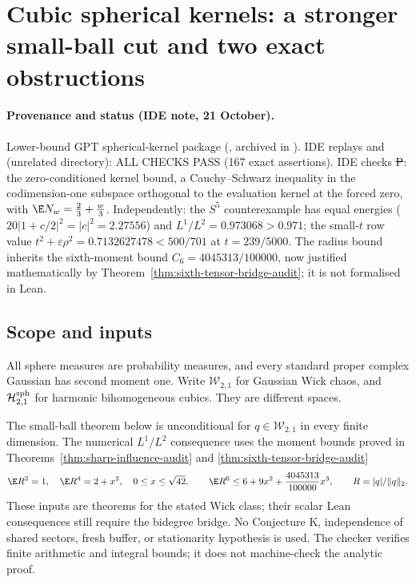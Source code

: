 \section[Cubic spherical kernels]{Cubic spherical kernels: a stronger small-ball cut and two exact obstructions}
\label{ch:spherical-kernel-cut}

\paragraph{Provenance and status (IDE note, 21 October).} Lower-bound GPT spherical-kernel package (, archived in
). IDE replays  and  (unrelated directory): ALL CHECKS PASS
(167 exact assertions). IDE checks \st{P}: the zero-conditioned kernel bound, a Cauchy--Schwarz inequality in the codimension-one subspace orthogonal to
the evaluation kernel at the forced zero, with $\E N_w=\frac23+\frac w3$. Independently: the $S^5$ counterexample has equal energies ($20|1+c/2|^2=|c|^2=2.27556$)
and $L^1/L^2=0.973068>0.971$; the small-$t$ row value $t^2+\varepsilon\rho^2=0.7132627478<500/701$ at $t=239/5000$. The radius bound inherits the sixth-moment
bound $C_6=4045313/100000$, now justified mathematically by Theorem~\ref{thm:sixth-tensor-bridge-audit}; it is not formalised in Lean.

\subsection{Scope and inputs}
All sphere measures are probability measures, and every standard proper complex Gaussian has second moment one. Write $\mathcal W_{2,1}$ for Gaussian Wick chaos, and $\mathcal H_{2,1}^{\rm sph}$ for harmonic bihomogeneous cubics. They are different spaces.

The small-ball theorem below is unconditional for $q\in\mathcal W_{2,1}$ in every finite dimension. The numerical $L^1/L^2$ consequence uses the moment bounds proved in Theorems~\ref{thm:sharp-influence-audit} and \ref{thm:sixth-tensor-bridge-audit}
\begin{equation}\label{eq:sk-moments}
 \E R^2=1,\quad \E R^4=2+x^2,\quad 0\le x\le\sqrt{42},\qquad
 \E R^6\le6+9x^2+\frac{4045313}{100000}x^3,
 \qquad R=|q|/\|q\|_2.
\end{equation}
These inputs are theorems for the stated Wick class; their scalar Lean consequences still require the bidegree bridge. No Conjecture K, independence of shared sectors, fresh buffer, or stationarity hypothesis is used. The checker verifies finite arithmetic and integral bounds; it does not machine-check the analytic proof.

